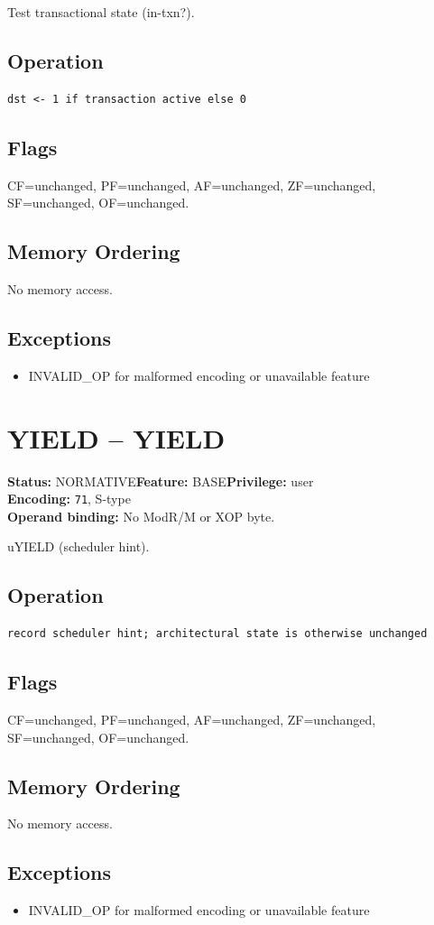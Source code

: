 \documentclass[10pt]{article}
\begin{document}
Test transactional state (in-txn?).

\subsection*{Operation}
\begin{lstlisting}
dst <- 1 if transaction active else 0
\end{lstlisting}
\subsection*{Flags}
CF=unchanged, PF=unchanged, AF=unchanged, ZF=unchanged, SF=unchanged, OF=unchanged.
\subsection*{Memory Ordering}
No memory access.
\subsection*{Exceptions}
\begin{itemize}
\item INVALID\_OP for malformed encoding or unavailable feature
\end{itemize}
\clearpage

\section{YIELD -- YIELD}
\textbf{Status:} NORMATIVE\quad \textbf{Feature:} BASE\quad \textbf{Privilege:} user\\
\textbf{Encoding:} \texttt{71}, S-type\\
\textbf{Operand binding:} No ModR/M or XOP byte.

uYIELD (scheduler hint).

\subsection*{Operation}
\begin{lstlisting}
record scheduler hint; architectural state is otherwise unchanged
\end{lstlisting}
\subsection*{Flags}
CF=unchanged, PF=unchanged, AF=unchanged, ZF=unchanged, SF=unchanged, OF=unchanged.
\subsection*{Memory Ordering}
No memory access.
\subsection*{Exceptions}
\begin{itemize}
\item INVALID\_OP for malformed encoding or unavailable feature
\end{itemize}
\clearpage
\end{document}
